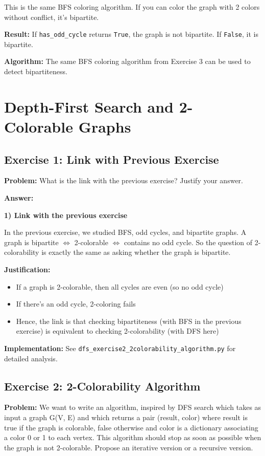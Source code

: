 \documentclass[12pt,a4paper]{article}
\begin{document}
This is the same BFS coloring algorithm. If you can color the graph with 2 colors without conflict, it's bipartite.


\textbf{Result:} If \texttt{has\_odd\_cycle} returns \texttt{True}, the graph is not bipartite. If \texttt{False}, it is bipartite.

\textbf{Algorithm:} The same BFS coloring algorithm from Exercise 3 can be used to detect bipartiteness.

\section{Depth-First Search and 2-Colorable Graphs}

\subsection{Exercise 1: Link with Previous Exercise}

\textbf{Problem:} What is the link with the previous exercise? Justify your answer.

\textbf{Answer:} 

\textbf{1) Link with the previous exercise}

In the previous exercise, we studied BFS, odd cycles, and bipartite graphs.
A graph is bipartite $\Leftrightarrow$ 2-colorable $\Leftrightarrow$ contains no odd cycle.
So the question of 2-colorability is exactly the same as asking whether the graph is bipartite.

\textbf{Justification:}
\begin{itemize}
\item If a graph is 2-colorable, then all cycles are even (so no odd cycle)
\item If there's an odd cycle, 2-coloring fails
\item Hence, the link is that checking bipartiteness (with BFS in the previous exercise) is equivalent to checking 2-colorability (with DFS here)
\end{itemize}



\textbf{Implementation:} See \texttt{dfs\_exercise2\_2colorability\_algorithm.py} for detailed analysis.

\subsection{Exercise 2: 2-Colorability Algorithm}

\textbf{Problem:} We want to write an algorithm, inspired by DFS search which takes as input a graph G(V, E) and which returns a pair (result, color) where result is true if the graph is colorable, false otherwise and color is a dictionary associating a color 0 or 1 to each vertex. This algorithm should stop as soon as possible when the graph is not 2-colorable. Propose an iterative version or a recursive version.
\end{document}

